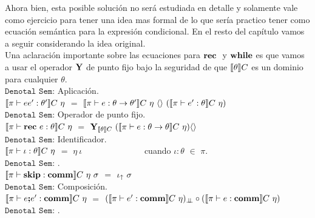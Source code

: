 Ahora bien, esta posible soluci\'on no ser\'a estudiada en detalle y solamente
vale como ejercicio para tener una idea mas formal de lo que ser\'ia practico
tener como ecuaci\'on sem\'antica para la expresi\'on condicional. En el resto 
del cap\'itulo vamos a seguir considerando la idea original.\\

Una aclaraci\'on importante sobre las ecuaciones para $\textbf{rec} \ $ y $\textbf{while}{}{}$
es que vamos a usar el operador $\textbf{Y}$ de punto fijo bajo la seguridad de que
$\llbracket \theta \rrbracket C$ es un dominio para cualquier $\theta$.\\

\noindent
$\texttt{Denotal Sem:}$ Aplicaci\'on.\\

$\semBrcks{ \pi \vdash ee' : \theta' }C \ \eta$ 
$=$ 
$\llbracket  \pi \vdash e : \theta \rightarrow \theta'  \rrbracket C \ \eta \ \langle  \rangle \
(\llbracket  \pi \vdash e' : \theta  \rrbracket C \ \eta)$\\

\noindent
$\texttt{Denotal Sem:}$ Operador de punto fijo.\\

$\semBrcks{ \pi \vdash \rec e : \theta}C \ \eta$ 
$=$ 
$\Y_{\semBrcks{\theta}C} \ 
(\semBrcks{ \pi \vdash e : \theta \rightarrow \theta}C \ \eta) \lrangles{}$\\

\noindent
$\texttt{Denotal Sem:}$ Identificador.\\

$\semBrcks{ \pi \vdash \iota : \theta }C \ \eta$ $=$ $\eta \ \iota$
\ \ \ \ \ \ \ \ \ \ \ \ \ \ cuando $\iota:\theta$ $\in$ $\pi$.\\

\noindent
$\texttt{Denotal Sem:}$ \cskip.\\

$\semBrcks{ \pi \vdash \cskip : \commt }C \ \eta \ \sigma$ $=$ $\iota_{\uparrow} \ \sigma$\\

\noindent
$\texttt{Denotal Sem:}$ Composici\'on.\\

$\llbracket  \pi \vdash e \textbf{;} e' : \textbf{comm}  \rrbracket C \ \eta$ 
$=$ 
$(\semBrcks{\pi \vdash e' : \commt}C \ \eta)_{\dbot}
\circ
(\semBrcks{ \pi \vdash e : \commt}C \ \eta)$\\

\noindent
$\texttt{Denotal Sem:}$ \cwhile.\\

